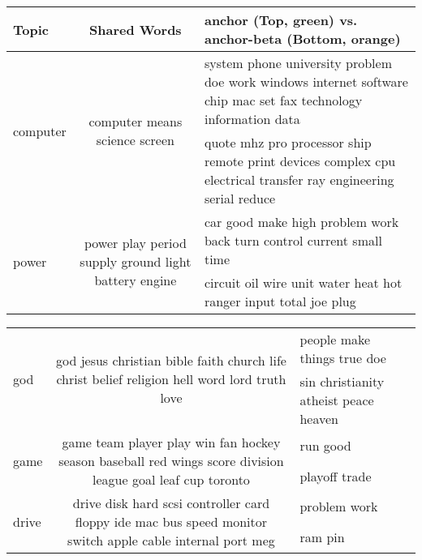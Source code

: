   \begin{tabular}{|p{1.2cm}|c|p{8cm}|} \hline
           Topic & Shared Words & {\bf anchor} (Top, green) vs. {\bf anchor-beta} (Bottom, orange) \\ \hline
\multirow{2}{*}{computer}	&	\multirow{2}{4cm}{computer means science screen}	&	\cellcolor{green!30}system phone university problem doe work windows internet software chip mac set fax technology information data\\
&	&	\cellcolor{orange!30}quote mhz pro processor ship remote print devices complex cpu electrical transfer ray engineering serial reduce\\ \hline

\multirow{2}{*}{power}	&	\multirow{2}{4cm}{power play period supply ground light battery engine}	&	\cellcolor{green!30}car good make high problem work back turn control current small time\\
&	&	\cellcolor{orange!30}circuit oil wire unit water heat hot ranger input total joe plug\\ \hline
\end{tabular}

\begin{tabular}{|p{1.2cm}|c|p{5cm}|} \hline
\multirow{2}{*}{god}	&	\multirow{2}{7cm}{god jesus christian bible faith church life christ belief religion hell word lord truth love}	&	\cellcolor{green!30}people make things true doe\\
&	&	\cellcolor{orange!30}sin christianity atheist peace heaven\\ \hline

\multirow{2}{*}{game}	&	\multirow{2}{7cm}{game team player play win fan hockey season baseball red wings score division league goal leaf cup toronto}	&	\cellcolor{green!30}run good\\
&	&	\cellcolor{orange!30}playoff trade\\ \hline

\multirow{2}{*}{drive}	&	\multirow{2}{7cm}{drive disk hard scsi controller card floppy ide mac bus speed monitor switch apple cable internal port meg}	&	\cellcolor{green!30}problem work\\
&	&	\cellcolor{orange!30}ram pin\\ \hline
\end{tabular}
